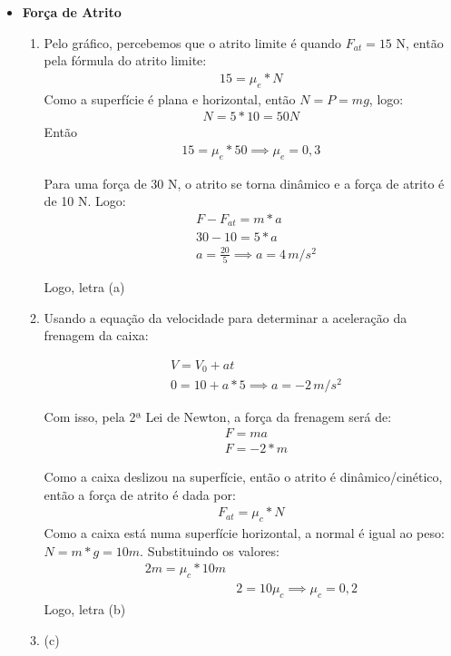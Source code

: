 \documentclass[12pt,letterpaper,fleqn]{article}
\begin{document}
\begin{itemize}
\item \textbf{Força de Atrito}

\begin{enumerate}
    \item Pelo gráfico, percebemos que o atrito limite é quando $F_{at} = 15$ N, então pela fórmula do atrito limite:
    \begin{align*}
        15=\mu_e*N
    \end{align*}
    Como a superfície é plana e horizontal, então $N = P = mg$, logo:
    \begin{align*}
        N = 5*10 = 50 N
    \end{align*}
    Então
    \begin{align*}
        15 = \mu_e*50 \implies \boxed{\mu_e = 0,3}
    \end{align*}
    
    Para uma força de 30 N, o atrito se torna dinâmico e a força de atrito é de 10 N. Logo:
    \begin{align*}
        &F - F_{at} = m*a \\
        &30 - 10 = 5*a \\
        &a = \frac{20}{5} \implies \boxed{a= 4\,m/s^2}
    \end{align*}
    
    Logo, letra (a)
    
    \item Usando a equação da velocidade para determinar a aceleração da frenagem da caixa:
    
    \begin{align*}
        &V=V_0 + at \\
        &0=10 + a*5 \implies a =-2\,m/s^2
    \end{align*}
    
    Com isso, pela 2ª Lei de Newton, a força da frenagem será de:
    \begin{align*}
        &F=ma\\
        &F =-2*m
    \end{align*}
    
    Como a caixa deslizou na superfície, então o atrito é dinâmico/cinético, então a força de atrito é dada por:
    \begin{align*}
        F_{at} = \mu_c*N
    \end{align*}
    Como a caixa está numa superfície horizontal, a normal é igual ao peso: $N=m*g=10m$. Substituindo os valores:
    \begin{align*}
        2m= \mu_c*10m \\
        &2=10\mu_c \implies \boxed{\mu_c = 0,2}
    \end{align*}
    Logo, letra (b)
    \item (c)
    

\end{enumerate}
\end{itemize}
\end{document}
